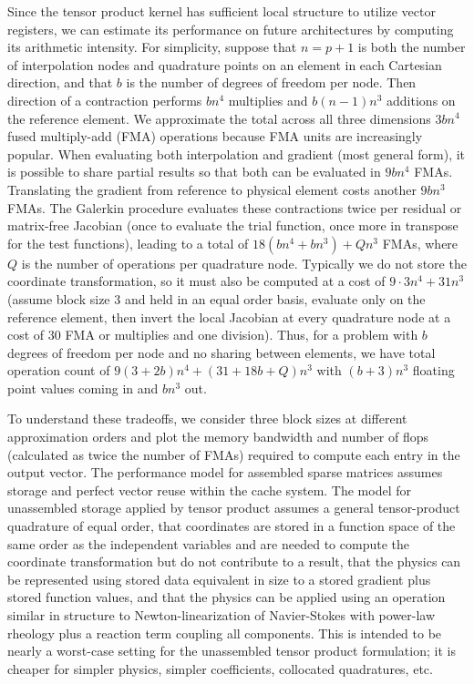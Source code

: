 Since the tensor product kernel has sufficient local structure to utilize vector registers, we can estimate its performance on future architectures by computing its arithmetic intensity.
For simplicity, suppose that $n = p+1$ is both the number of interpolation nodes and quadrature points on an element in each Cartesian direction, and that $b$ is the number of degrees of freedom per node.
Then direction of a contraction performs $bn^4$ multiplies and $b(n-1)n^3$ additions on the reference element.
We approximate the total across all three dimensions $3bn^4$ fused multiply-add (FMA) operations because FMA units are increasingly popular.
When evaluating both interpolation and gradient (most general form), it is possible to share partial results so that both can be evaluated in $9bn^4$ FMAs.
Translating the gradient from reference to physical element costs another $9bn^3$ FMAs.
The Galerkin procedure evaluates these contractions twice per residual or matrix-free Jacobian (once to evaluate the trial function, once more in transpose for the test functions), leading to a total of $18(bn^4 + bn^3) + Qn^3$ FMAs, where $Q$ is the number of operations per quadrature node.
Typically we do not store the coordinate transformation, so it must also be computed at a cost of $9\cdot 3n^4 + 31n^3$ (assume block size 3 and held in an equal order basis, evaluate only on the reference element, then invert the local Jacobian at every quadrature node at a cost of 30 FMA or multiplies and one division).
Thus, for a problem with $b$ degrees of freedom per node and no sharing between elements, we have total operation count of $9(3 + 2b)n^4 + (31+18b + Q)n^3$ with $(b+3)n^3$ floating point values coming in and $bn^3$ out.

To understand these tradeoffs, we consider three block sizes at different approximation orders and plot the memory bandwidth and number of flops (calculated as twice the number of FMAs) required to compute each entry in the output vector.
The performance model for assembled sparse matrices assumes {\BAIJ} storage and perfect vector reuse within the cache system.
The model for unassembled storage applied by tensor product assumes a general tensor-product quadrature of equal order, that coordinates are stored in a function space of the same order as the independent variables and are needed to compute the coordinate transformation but do not contribute to a result, that the physics can be represented using stored data equivalent in size to a stored gradient plus stored function values, and that the physics can be applied using an operation similar in structure to Newton-linearization of Navier-Stokes with power-law rheology plus a reaction term coupling all components.
This is intended to be nearly a worst-case setting for the unassembled tensor product formulation; it is cheaper for simpler physics, simpler coefficients, collocated quadratures, etc.

